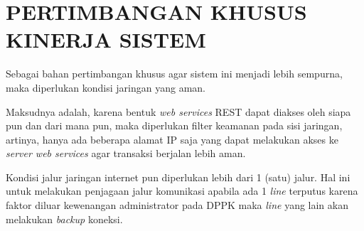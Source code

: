 \chapter{PERTIMBANGAN KHUSUS KINERJA SISTEM}

Sebagai bahan pertimbangan khusus agar sistem ini menjadi lebih sempurna, maka diperlukan kondisi jaringan yang aman. 

Maksudnya adalah, karena bentuk \textit{web services} REST dapat diakses oleh siapa pun dan dari mana pun, maka diperlukan filter keamanan pada sisi jaringan, artinya, hanya ada beberapa alamat IP saja yang dapat melakukan akses ke \textit{server web services} agar transaksi berjalan lebih aman.

Kondisi jalur jaringan internet pun diperlukan lebih dari 1 (satu) jalur. Hal ini untuk melakukan penjagaan jalur komunikasi apabila ada 1 \textit{line} terputus karena faktor diluar kewenangan administrator pada DPPK maka \textit{line} yang lain akan melakukan \textit{backup} koneksi.